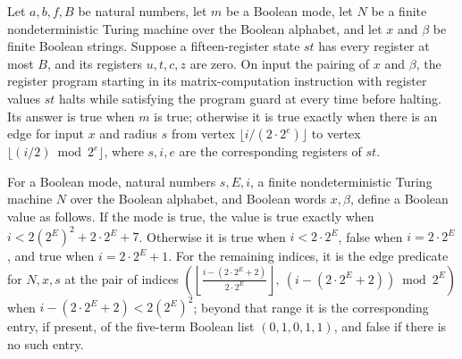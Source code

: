 \begin{theorem}
\label{Complexity.PathHard.matrix_halt}
\leanok
{}
Let $a,b,f,B$ be natural numbers, let $m$ be a Boolean mode, let $N$ be a finite
nondeterministic Turing machine over the Boolean alphabet, and let $x$ and $\beta$ be
finite Boolean strings. Suppose a fifteen-register state $st$ has every register at most
$B$, and its registers $u,t,c,z$ are zero. On input the pairing of $x$ and $\beta$, the
register program starting in its matrix-computation instruction with register values
$st$ halts while satisfying the program guard at every time before halting. Its answer
is true when $m$ is true; otherwise it is true exactly when there is an edge for input
$x$ and radius $s$ from vertex $\lfloor i/(2\cdot 2^e)\rfloor$ to vertex $\lfloor
(i/2)\bmod 2^e\rfloor$, where $s,i,e$ are the corresponding registers of $st$.
\end{theorem}

\begin{definition}
\label{Complexity.PathHard.wAns}
\leanok
{}
For a Boolean mode, natural numbers $s,E,i$, a finite nondeterministic Turing machine
$N$ over the Boolean alphabet, and Boolean words $x,\beta$, define a Boolean value as
follows. If the mode is true, the value is true exactly when $i<2(2^E)^2+2\cdot 2^E+7$.
Otherwise it is true when $i<2\cdot 2^E$, false when $i=2\cdot 2^E$, and true when
$i=2\cdot 2^E+1$. For the remaining indices, it is the edge predicate for $N,x,s$ at the
pair of indices $\left(\left\lfloor\frac{i-(2\cdot 2^E+2)}{2\cdot 2^E}\right\rfloor,\
(i-(2\cdot 2^E+2))\bmod 2^E\right)$ when $i-(2\cdot 2^E+2)<2(2^E)^2$; beyond that range
it is the corresponding entry, if present, of the five-term Boolean list $(0,1,0,1,1)$,
and false if there is no such entry.
\end{definition}

